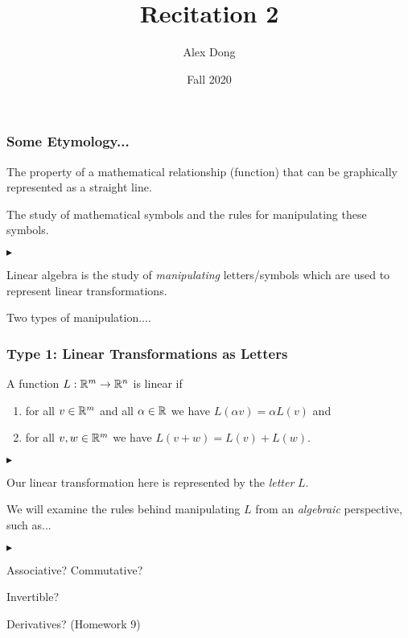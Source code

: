 \documentclass[table]{beamer}
\title{Recitation 2}
\author{Alex Dong}
\institute{CDS, NYU}
\date{Fall 2020}
\renewenvironment{itemize}
\renewenvironment{enumerate}%
{\begin{list}{\arabic{enumi}.}%
      {\setlength{\leftmargin}{2.5em}%
       \setlength{\itemsep}{-\parsep}%
       \setlength{\topsep}{-\parskip}%
       \usecounter{enumi}}%
 }{\end{list}}
\renewenvironment{itemize}%
{\begin{list}{$\blacktriangleright$}%
      {\setlength{\leftmargin}{2.5em}%
       \setlength{\itemsep}{-\parsep}%
       \setlength{\topsep}{-\parskip}%
       \usecounter{enumi}}%
 }{\end{list}}
\begin{document}

\frame{\titlepage} 


\begin{frame}
\frametitle{Some Etymology...}

\begin{definition}
The property of a mathematical relationship (function) that can be graphically represented as a straight line.
\end{definition}

\begin{definition}
The study of mathematical symbols and the rules for manipulating these symbols.
\end{definition}
\begin{itemize}
\item Linear algebra is the study of \textit{manipulating} letters/symbols which are used to represent linear transformations.
\item Two types of manipulation....
\end{itemize}
\end{frame}


\begin{frame}
\frametitle{Type 1: Linear Transformations as Letters}
\begin{definition}	        
		A function $L: \mathbb{R}^m \to \mathbb{R}^n$ is linear if
	\begin{enumerate}
		\item for all $v \in \mathbb{R}^m$ and all $\alpha \in \mathbb{R}$ we have $L(\alpha v) = \alpha L(v)$ and
		\item for all $v,w \in \mathbb{R}^m$ we have $L(v + w) = L(v) + L(w)$.
	\end{enumerate}
\end{definition}
\begin{itemize}
\item Our linear transformation here is represented by the \textit{letter} $L$.
\item We will examine the rules behind manipulating $L$ from an \textit{algebraic} perspective, such as...
\begin{itemize}
\item Associative? Commutative?
\item Invertible?
\item Derivatives? (Homework 9)
\end{itemize}
\end{itemize}
\end{frame}
\end{document}
